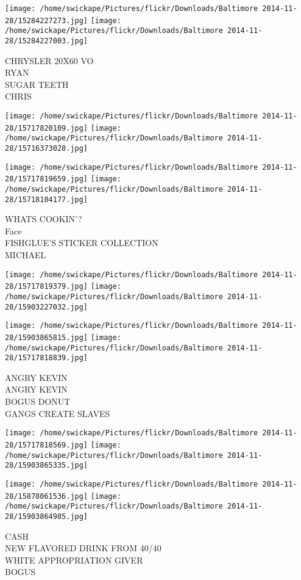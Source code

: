 \documentclass[10pt,letterpaper]{article}
\begin{document}
\texttt{[image: /home/swickape/Pictures/flickr/Downloads/Baltimore 2014-11-28/15284227273.jpg]}
\texttt{[image: /home/swickape/Pictures/flickr/Downloads/Baltimore 2014-11-28/15284227003.jpg]}

CHRYSLER 20X60 VO\\
RYAN\\
SUGAR TEETH\\
CHRIS
\pagebreak

\texttt{[image: /home/swickape/Pictures/flickr/Downloads/Baltimore 2014-11-28/15717820109.jpg]}
\texttt{[image: /home/swickape/Pictures/flickr/Downloads/Baltimore 2014-11-28/15716373028.jpg]}

\texttt{[image: /home/swickape/Pictures/flickr/Downloads/Baltimore 2014-11-28/15717819659.jpg]}
\texttt{[image: /home/swickape/Pictures/flickr/Downloads/Baltimore 2014-11-28/15718104177.jpg]}

WHATS COOKIN'?\\
Face\\
FISHGLUE'S STICKER COLLECTION\\
MICHAEL
\pagebreak

\texttt{[image: /home/swickape/Pictures/flickr/Downloads/Baltimore 2014-11-28/15717819379.jpg]}
\texttt{[image: /home/swickape/Pictures/flickr/Downloads/Baltimore 2014-11-28/15903227032.jpg]}

\texttt{[image: /home/swickape/Pictures/flickr/Downloads/Baltimore 2014-11-28/15903865815.jpg]}
\texttt{[image: /home/swickape/Pictures/flickr/Downloads/Baltimore 2014-11-28/15717818839.jpg]}

ANGRY KEVIN\\
ANGRY KEVIN\\
BOGUS DONUT\\
GANGS CREATE SLAVES
\pagebreak

\texttt{[image: /home/swickape/Pictures/flickr/Downloads/Baltimore 2014-11-28/15717818569.jpg]}
\texttt{[image: /home/swickape/Pictures/flickr/Downloads/Baltimore 2014-11-28/15903865335.jpg]}

\texttt{[image: /home/swickape/Pictures/flickr/Downloads/Baltimore 2014-11-28/15878061536.jpg]}
\texttt{[image: /home/swickape/Pictures/flickr/Downloads/Baltimore 2014-11-28/15903864985.jpg]}

CASH\\
NEW FLAVORED DRINK FROM 40/40\\
WHITE APPROPRIATION GIVER\\
BOGUS
\pagebreak
\end{document}

